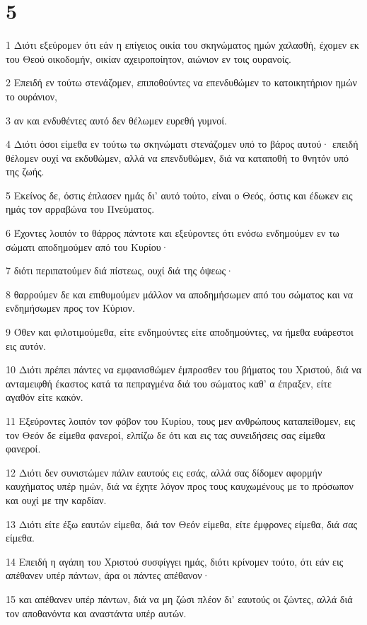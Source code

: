 \chapter{5}

\par 1 Διότι εξεύρομεν ότι εάν η επίγειος οικία του σκηνώματος ημών χαλασθή, έχομεν εκ του Θεού οικοδομήν, οικίαν αχειροποίητον, αιώνιον εν τοις ουρανοίς.
\par 2 Επειδή εν τούτω στενάζομεν, επιποθούντες να επενδυθώμεν το κατοικητήριον ημών το ουράνιον,
\par 3 αν και ενδυθέντες αυτό δεν θέλωμεν ευρεθή γυμνοί.
\par 4 Διότι όσοι είμεθα εν τούτω τω σκηνώματι στενάζομεν υπό το βάρος αυτού· επειδή θέλομεν ουχί να εκδυθώμεν, αλλά να επενδυθώμεν, διά να καταποθή το θνητόν υπό της ζωής.
\par 5 Εκείνος δε, όστις έπλασεν ημάς δι' αυτό τούτο, είναι ο Θεός, όστις και έδωκεν εις ημάς τον αρραβώνα του Πνεύματος.
\par 6 Έχοντες λοιπόν το θάρρος πάντοτε και εξεύροντες ότι ενόσω ενδημούμεν εν τω σώματι αποδημούμεν από του Κυρίου·
\par 7 διότι περιπατούμεν διά πίστεως, ουχί διά της όψεως·
\par 8 θαρρούμεν δε και επιθυμούμεν μάλλον να αποδημήσωμεν από του σώματος και να ενδημήσωμεν προς τον Κύριον.
\par 9 Όθεν και φιλοτιμούμεθα, είτε ενδημούντες είτε αποδημούντες, να ήμεθα ευάρεστοι εις αυτόν.
\par 10 Διότι πρέπει πάντες να εμφανισθώμεν έμπροσθεν του βήματος του Χριστού, διά να ανταμειφθή έκαστος κατά τα πεπραγμένα διά του σώματος καθ' α έπραξεν, είτε αγαθόν είτε κακόν.
\par 11 Εξεύροντες λοιπόν τον φόβον του Κυρίου, τους μεν ανθρώπους καταπείθομεν, εις τον Θεόν δε είμεθα φανεροί, ελπίζω δε ότι και εις τας συνειδήσεις σας είμεθα φανεροί.
\par 12 Διότι δεν συνιστώμεν πάλιν εαυτούς εις εσάς, αλλά σας δίδομεν αφορμήν καυχήματος υπέρ ημών, διά να έχητε λόγον προς τους καυχωμένους με το πρόσωπον και ουχί με την καρδίαν.
\par 13 Διότι είτε έξω εαυτών είμεθα, διά τον Θεόν είμεθα, είτε έμφρονες είμεθα, διά σας είμεθα.
\par 14 Επειδή η αγάπη του Χριστού συσφίγγει ημάς, διότι κρίνομεν τούτο, ότι εάν εις απέθανεν υπέρ πάντων, άρα οι πάντες απέθανον·
\par 15 και απέθανεν υπέρ πάντων, διά να μη ζώσι πλέον δι' εαυτούς οι ζώντες, αλλά διά τον αποθανόντα και αναστάντα υπέρ αυτών.
